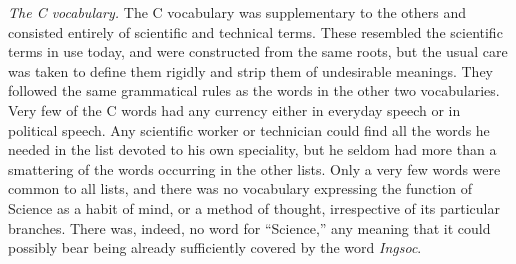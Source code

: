 \sectionbreak

\emph{The C vocabulary.} The C vocabulary was supplementary to the
others and consisted entirely of scientific and technical terms. These
resembled the scientific terms in use today, and were constructed from
the same roots, but the usual care was taken to define them rigidly and
strip them of undesirable meanings. They followed the same grammatical
rules as the words in the other two vocabularies. Very few of the C
words had any currency either in everyday speech or in political speech.
Any scientific worker or technician could find all the words he needed
in the list devoted to his own speciality, but he seldom had more than a
smattering of the words occurring in the other lists. Only a very few
words were common to all lists, and there was no vocabulary expressing
the function of Science as a habit of mind, or a method of thought,
irrespective of its particular branches. There was, indeed, no word for
``Science,'' any meaning that it could possibly bear being already
sufficiently covered by the word \emph{Ingsoc}.

\sectionbreak

